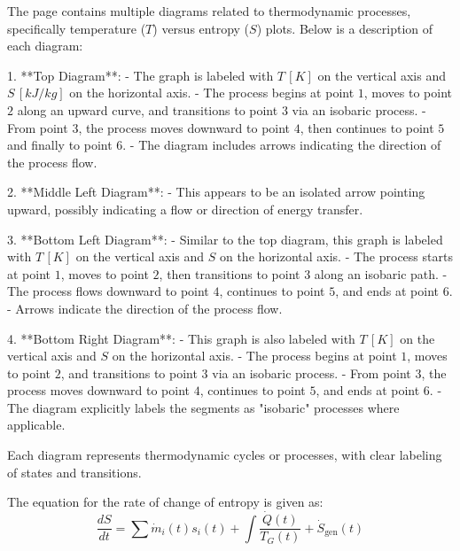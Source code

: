 The page contains multiple diagrams related to thermodynamic processes, specifically temperature (\( T \)) versus entropy (\( S \)) plots. Below is a description of each diagram:

1. **Top Diagram**:  
   - The graph is labeled with \( T \, [K] \) on the vertical axis and \( S \, [kJ/kg] \) on the horizontal axis.  
   - The process begins at point \( 1 \), moves to point \( 2 \) along an upward curve, and transitions to point \( 3 \) via an isobaric process.  
   - From point \( 3 \), the process moves downward to point \( 4 \), then continues to point \( 5 \) and finally to point \( 6 \).  
   - The diagram includes arrows indicating the direction of the process flow.  

2. **Middle Left Diagram**:  
   - This appears to be an isolated arrow pointing upward, possibly indicating a flow or direction of energy transfer.  

3. **Bottom Left Diagram**:  
   - Similar to the top diagram, this graph is labeled with \( T \, [K] \) on the vertical axis and \( S \) on the horizontal axis.  
   - The process starts at point \( 1 \), moves to point \( 2 \), then transitions to point \( 3 \) along an isobaric path.  
   - The process flows downward to point \( 4 \), continues to point \( 5 \), and ends at point \( 6 \).  
   - Arrows indicate the direction of the process flow.  

4. **Bottom Right Diagram**:  
   - This graph is also labeled with \( T \, [K] \) on the vertical axis and \( S \) on the horizontal axis.  
   - The process begins at point \( 1 \), moves to point \( 2 \), and transitions to point \( 3 \) via an isobaric process.  
   - From point \( 3 \), the process moves downward to point \( 4 \), continues to point \( 5 \), and ends at point \( 6 \).  
   - The diagram explicitly labels the segments as "isobaric" processes where applicable.  

Each diagram represents thermodynamic cycles or processes, with clear labeling of states and transitions.

The equation for the rate of change of entropy is given as:  
\[
\frac{dS}{dt} = \sum \dot{m}_i(t) s_i(t) + \int \frac{\dot{Q}(t)}{T_G(t)} + \dot{S}_{\text{gen}}(t)
\]